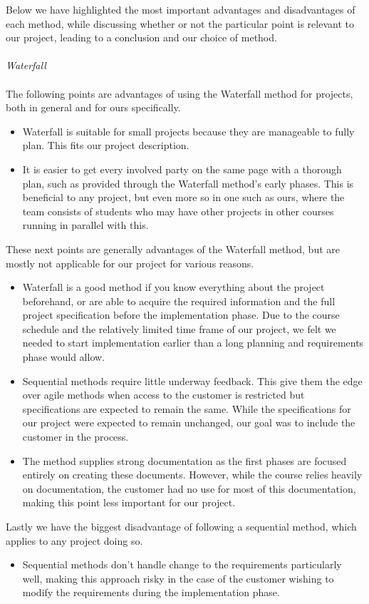 Below we have highlighted the most important advantages and disadvantages of each method, while discussing whether or not the particular point is relevant to our project, leading to a conclusion and our choice of method. \\ \\
\emph{Waterfall} \\ \\
The following points are advantages of using the Waterfall method for projects, both in general and for ours specifically.
	\begin{itemize}
		\item Waterfall is suitable for small projects because they are manageable to fully plan. This fits our project description.
		\item It is easier to get every involved party on the same page with a thorough plan, such as provided through the Waterfall method's early phases. This is beneficial to any project, but even more so in one such as ours, where the team consists of students who may have other projects in other courses running in parallel with this.
	\end{itemize}
These next points are generally advantages of the Waterfall method, but are mostly not applicable for our project for various reasons.
	\begin{itemize}
		\item Waterfall is a good method if you know everything about the project beforehand, or are able to acquire the required information and the full project specification before the implementation phase. Due to the course schedule and the relatively limited time frame of our project, we felt we needed to start implementation earlier than a long planning and requirements phase would allow.
		\item Sequential methods require little underway feedback. This give them the edge over agile methods when access to the customer is restricted but specifications are expected to remain the same. While the specifications for our project were expected to remain unchanged, our goal was to include the customer in the process.
		\item The method supplies strong documentation as the first phases are focused entirely on creating these documents. However, while the course relies heavily on documentation, the customer had no use for most of this documentation, making this point less important for our project.
	\end{itemize}
Lastly we have the biggest disadvantage of following a sequential method, which applies to any project doing so.
	\begin{itemize}
		\item Sequential methods don't handle change to the requirements particularly well, making this approach risky in the case of the customer wishing to modify the requirements during the implementation phase.
	\end{itemize}

